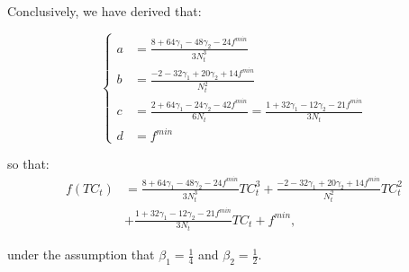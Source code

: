 \documentclass[12pt]{article}
\begin{document}
\begin{appendices}
		Conclusively, we have derived that:
		
        \begin{equation} \label{eq:cubic_a_b_c}
		    \begin{cases}
		        a &= \frac{8 + 64\gamma_1 - 48\gamma_2 -24f^{min}}{3N_t^3} \\
		        b &= \frac{-2 - 32\gamma_1 + 20\gamma_2 + 14f^{min}}{N_t^2} \\
		        c &= \frac{2 + 64\gamma_1 - 24\gamma_2 - 42f^{min}}{6N_t} = \frac{1 + 32\gamma_1 - 12\gamma_2 - 21f^{min}}{3N_t} \\
		        d &= f^{min}
		    \end{cases}
		\end{equation}
		
		\noindent so that:
		\begin{align*}
		f(TC_t) &= \frac{8 + 64\gamma_1 - 48\gamma_2 -24f^{min}}{3N_t^3}TC_t^3 + \frac{-2 - 32\gamma_1 + 20\gamma_2 + 14f^{min}}{N_t^2}TC_t^2 \\
		&+ \frac{1 + 32\gamma_1 - 12\gamma_2 - 21f^{min}}{3N_t}TC_t + f^{min},
		\end{align*}
		
		\noindent under the assumption that $\beta_1 = \frac{1}{4}$ and $\beta_2 = \frac{1}{2}$.
	
	\end{appendices}
	
\end{document}
